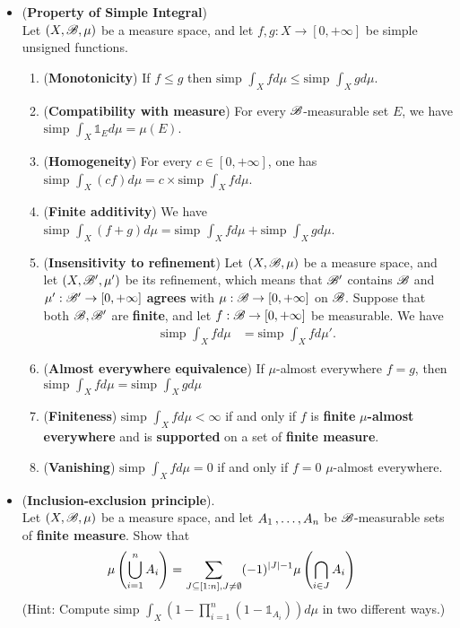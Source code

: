 \documentclass[11pt]{article}
\begin{document}
\begin{itemize}
\item \begin{proposition} (\textbf{Property of Simple Integral})\\
Let  $(X, {\mathscr B}, \mu)$ be a measure space, and let $f, g: X \rightarrow [0, +\infty]$  be simple unsigned functions.
\begin{enumerate}
\item (\textbf{Monotonicity}) If $f \le g$  then $\text{simp }\int_X f d\mu \le \text{simp }\int_X g d\mu$.
\item (\textbf{Compatibility with measure}) For every ${\mathscr B}$-measurable set $E$, we have $\text{simp }\int_X \mathds{1}_{E} d\mu = \mu(E)$.
\item (\textbf{Homogeneity}) For every $c \in [0, +\infty]$,  one has $\text{simp }\int_X (cf) d\mu = c\times \text{simp }\int_X f d\mu  $.
\item (\textbf{Finite additivity}) We have $\text{simp }\int_X (f + g)d\mu = \text{simp }\int_X f d\mu + \text{simp }\int_X g d\mu$.
\item (\textbf{Insensitivity to refinement}) Let $(X, {\mathscr B}, \mu)$ be a measure space, and let $(X, {\mathscr B}', \mu')$ be its refinement, which means that ${\mathscr B}'$ contains ${\mathscr B}$ and $\mu': {\mathscr B}' \rightarrow [0, +\infty]$ \textbf{agrees} with $\mu: {\mathscr B} \rightarrow [0, +\infty]$ on ${\mathscr B}$. Suppose that both ${\mathscr B}, {\mathscr B}'$ are \textbf{finite}, and let $f: {\mathscr B} \rightarrow [0, +\infty]$ be measurable. We have
\begin{align*}
\text{simp }\int_{X} f d\mu &= \text{simp }\int_{X} f d\mu'.
\end{align*}
\item (\textbf{Almost everywhere equivalence}) If $\mu$-almost everywhere $f =g$, then  $\text{simp }\int_X f d\mu =  \text{simp }\int_X g d\mu$
\item (\textbf{Finiteness}) $\text{simp }\int_X f d\mu < \infty$  if and only if $f$  is \textbf{finite} \textbf{$\mu$-almost everywhere} and is \textbf{supported} on a set of \textbf{finite measure}.
\item (\textbf{Vanishing}) $\text{simp }\int_X f d\mu  = 0$  if and only if $f = 0$ $\mu$-almost everywhere.
\end{enumerate}
\end{proposition}

\item \begin{proposition}(\textbf{Inclusion-exclusion principle}).\\
 Let $(X, {\mathscr B}, \mu)$ be a measure space, and let $A_1 \,{,}\ldots{,}\, A_n$ be ${\mathscr B}$-measurable sets of \textbf{finite measure}. Show that
 \begin{align*}
\mu\left(\bigcup_{i=1}^{n}A_i\right) &= \sum_{J \subseteq [1:n], J \neq \emptyset}(-1)^{\left\lvert J \right\rvert-1}\mu\left(\bigcap_{i\in J}A_i\right)
 \end{align*}
(Hint: Compute $\text{simp }\int_{X}(1 - \prod_{i=1}^{n}(1- \mathds{1}_{A_i})) d\mu$ in two different ways.)
\end{proposition}


\end{itemize}
\end{document}
